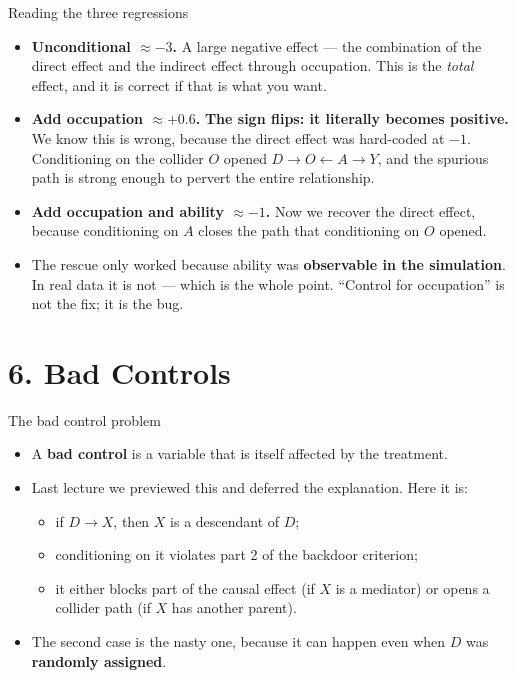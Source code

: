 \documentclass[
  11pt,
  ignorenonframetext,
  aspectratio=169,
]{beamer}
\providecommand{\tightlist}{%
  \setlength{\itemsep}{0pt}\setlength{\parskip}{0pt}}
\begin{document}
\begin{frame}{Reading the three regressions}
\protect{}\label{reading-the-three-regressions}
\begin{itemize}
\tightlist
\item
  \textbf{Unconditional \(\approx -3\).} A large negative effect --- the
  combination of the direct effect and the indirect effect through
  occupation. This is the \emph{total} effect, and it is correct if that
  is what you want.
\item
  \textbf{Add occupation \(\approx +0.6\).} \textbf{The sign flips: it
  literally becomes positive.} We know this is wrong, because the direct
  effect was hard-coded at \(-1\). Conditioning on the collider \(O\)
  opened \(D \to O \leftarrow A \to Y\), and the spurious path is strong
  enough to pervert the entire relationship.
\item
  \textbf{Add occupation and ability \(\approx -1\).} Now we recover the
  direct effect, because conditioning on \(A\) closes the path that
  conditioning on \(O\) opened.
\item
  The rescue only worked because ability was \textbf{observable in the
  simulation}. In real data it is not --- which is the whole point.
  ``Control for occupation'' is not the fix; it is the bug.
\end{itemize}
\end{frame}

\section{6. Bad Controls}\label{bad-controls}

\begin{frame}{The bad control problem}
\protect{}\label{the-bad-control-problem}
\begin{itemize}
\tightlist
\item
  A \textbf{bad control} is a variable that is itself affected by the
  treatment.
\item
  Last lecture we previewed this and deferred the explanation. Here it
  is:

  \begin{itemize}
  \tightlist
  \item
    if \(D \to X\), then \(X\) is a descendant of \(D\);
  \item
    conditioning on it violates part 2 of the backdoor criterion;
  \item
    it either blocks part of the causal effect (if \(X\) is a mediator)
    or opens a collider path (if \(X\) has another parent).
  \end{itemize}
\item
  The second case is the nasty one, because it can happen even when
  \(D\) was \textbf{randomly assigned}.
\end{itemize}
\end{frame}
\end{document}
